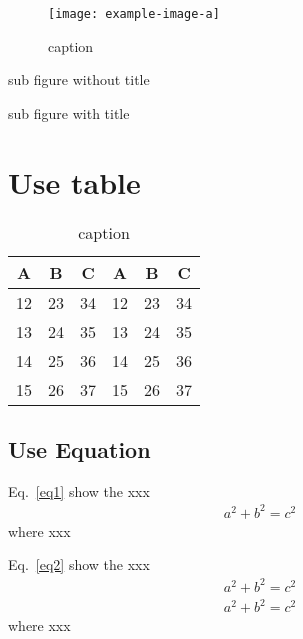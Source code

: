 \documentclass{swmcmthesis}
\begin{document}
\begin{figure}[h!t]
	\centering
	\texttt{[image: example-image-a]}
	\caption{caption}
	\label{fig:label}
\end{figure}

sub figure without title

\begin{figure}[h!t]
\centering
{}\hfill
{}
\end{figure}

\newpage
sub figure with title

\begin{figure}[h!t]
\centering
{}\hfill
{}
\end{figure}

\section{Use table}

\begin{table}[h!t]
\centering
\caption{caption}
\label{tbl:label}
\begin{tabular}{cccccc}
\toprule
A & B & C & A & B & C \\
\midrule
12 & 23 & 34 & 12 & 23 & 34 \\
13 & 24 & 35 & 13 & 24 & 35 \\
14 & 25 & 36 & 14 & 25 & 36 \\
15 & 26 & 37 & 15 & 26 & 37 \\
\bottomrule
\end{tabular}
\end{table}

\subsection{Use Equation}

Eq.~\eqref{eq1} show the xxx
\begin{align}
\label{eq1}
a^2+b^2=c^2
\end{align}
where xxx

Eq.~\eqref{eq2} show the xxx
\begin{align}
\label{eq2}
a^2+b^2=c^2\\
\label{eq3}
a^2+b^2=c^2
\end{align}
where xxx
\end{document}
